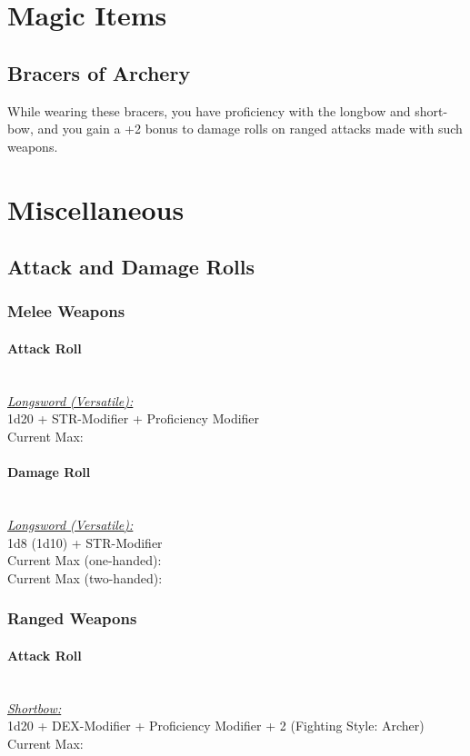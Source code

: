 {\section*{Magic Items}
\subsection*{Bracers of Archery}
While wearing these bracers, you have proficiency with the longbow and short-bow, and you gain a +2 bonus to damage rolls on ranged attacks made with such weapons.

\vfill\eject
\section*{Miscellaneous}
\subsection*{Attack and Damage Rolls}
\subsubsection*{Melee Weapons}
\paragraph*{Attack Roll}\hfill\\
\underline{\textit{Longsword (Versatile):}}\\
1d20 + STR-Modifier + Proficiency Modifier\\
\indent Current Max: 
\paragraph*{Damage Roll}\hfill\\
\underline{\textit{Longsword (Versatile):}}\\
1d8 (1d10) + STR-Modifier\\
\indent Current Max (one-handed): \\
\indent Current Max (two-handed): 
\subsubsection*{Ranged Weapons}
\paragraph*{Attack Roll}\hfill\\
\underline{\textit{Shortbow:}}\\
1d20 + DEX-Modifier + Proficiency Modifier + 2 (Fighting Style: Archer)\\
\indent Current Max: 
}
